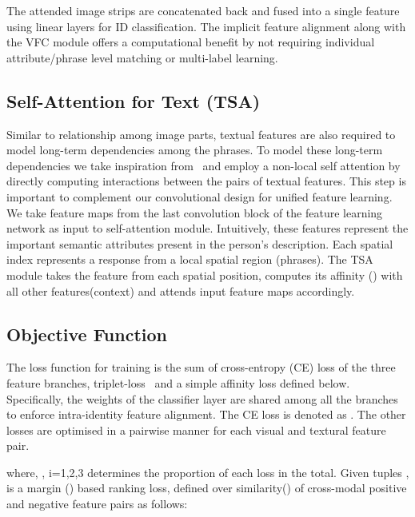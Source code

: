 \documentclass[letterpaper]{article} \usepackage{aaai22}  \usepackage{times}  \usepackage{helvet}  \usepackage{courier}  \usepackage[hyphens]{url}  \usepackage{graphicx} \urlstyle{rm} \def\UrlFont{\rm}  \usepackage{natbib}  \usepackage{caption} \DeclareCaptionStyle{ruled}{labelfont=normalfont,labelsep=colon,strut=off} \frenchspacing  \setlength{\pdfpagewidth}{8.5in}  \setlength{\pdfpageheight}{11in}  \usepackage{algorithm}
\begin{document}
The attended image strips are concatenated back and fused into a single feature  using linear layers for ID classification. The implicit feature alignment along with the VFC module offers a computational benefit by not requiring individual attribute/phrase level matching or multi-label learning.

\subsection{Self-Attention for Text (TSA)}
Similar to relationship among image parts, textual features are also required to model long-term dependencies among the phrases. To model these long-term dependencies we take inspiration from~\cite{wang2018non,cao2019gcnet} and employ a non-local self attention by directly computing interactions between the pairs of textual features. This step is important to complement our convolutional design for unified feature learning. We take feature maps from the last convolution block of the feature learning network as input to self-attention module. Intuitively, these features represent the important semantic attributes present in the person's description. Each spatial index represents a response from a local spatial region (phrases). The TSA module takes the feature from each spatial position, computes its affinity () with all other features(context) and attends input feature maps accordingly.
\begin{comment}
\setlength{\abovedisplayskip}{0pt} \setlength{\abovedisplayshortskip}{0pt}


\end{comment}

\subsection{Objective Function}
The loss function for training is the sum of cross-entropy (CE) loss of the three feature branches, triplet-loss~\cite{chechik2009large} and a simple affinity loss defined below. Specifically, the weights of the classifier layer are shared among all the branches to enforce intra-identity feature alignment. The CE loss is denoted as . The other losses are optimised in a pairwise manner for each visual and textural feature pair.
\setlength{\abovedisplayskip}{0pt} \setlength{\abovedisplayshortskip}{0pt}

where, , i=1,2,3 determines the proportion of each loss in the total.
Given tuples ,  is a margin () based ranking loss, defined over similarity() of cross-modal positive and negative feature pairs as follows:
\setlength{\abovedisplayskip}{0pt} \setlength{\abovedisplayshortskip}{0pt}
\end{document}
